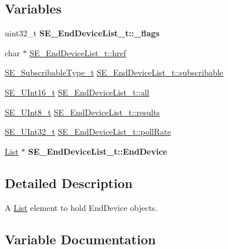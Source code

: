 \subsection*{Variables}
\begin{DoxyCompactItemize}
\item 
\mbox{\label{group__EndDeviceList_ga23e407063381c916123359bb2361aa6c}} 
uint32\+\_\+t {\bfseries S\+E\+\_\+\+End\+Device\+List\+\_\+t\+::\+\_\+flags}
\item 
char $\ast$ \hyperlink{group__EndDeviceList_ga2dee4395bae5adb1b32a956a23a94d05}{S\+E\+\_\+\+End\+Device\+List\+\_\+t\+::href}
\item 
\hyperlink{group__SubscribableType_ga5c41f553d369710ed34619266bf2551e}{S\+E\+\_\+\+Subscribable\+Type\+\_\+t} \hyperlink{group__EndDeviceList_ga2b2e8f1980c958770b758272899979d0}{S\+E\+\_\+\+End\+Device\+List\+\_\+t\+::subscribable}
\item 
\hyperlink{group__UInt16_gac68d541f189538bfd30cfaa712d20d29}{S\+E\+\_\+\+U\+Int16\+\_\+t} \hyperlink{group__EndDeviceList_gabb9e8efdbe6326b1cdf0aef5b232b73d}{S\+E\+\_\+\+End\+Device\+List\+\_\+t\+::all}
\item 
\hyperlink{group__UInt8_gaf7c365a1acfe204e3a67c16ed44572f5}{S\+E\+\_\+\+U\+Int8\+\_\+t} \hyperlink{group__EndDeviceList_gabaccd9c1e6895d28cbee5cc2eca2b23e}{S\+E\+\_\+\+End\+Device\+List\+\_\+t\+::results}
\item 
\hyperlink{group__UInt32_ga70bd4ecda3c0c85d20779d685a270cdb}{S\+E\+\_\+\+U\+Int32\+\_\+t} \hyperlink{group__EndDeviceList_gaadffae7b67b10a6e379b98a3e43f1c5e}{S\+E\+\_\+\+End\+Device\+List\+\_\+t\+::poll\+Rate}
\item 
\mbox{\label{group__EndDeviceList_gaacd818cbf5645500f6809f962a8244d9}} 
\hyperlink{structList}{List} $\ast$ {\bfseries S\+E\+\_\+\+End\+Device\+List\+\_\+t\+::\+End\+Device}
\end{DoxyCompactItemize}


\subsection{Detailed Description}
A \hyperlink{structList}{List} element to hold End\+Device objects. 

\subsection{Variable Documentation}
\mbox{\label{group__EndDeviceList_gabb9e8efdbe6326b1cdf0aef5b232b73d}} 
